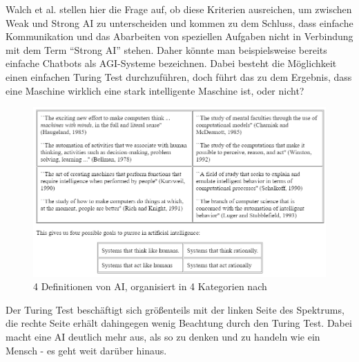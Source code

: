             Walch et al. stellen hier die Frage auf, ob diese Kriterien ausreichen, um zwischen Weak und Strong AI
            zu unterscheiden und kommen zu dem Schluss, dass einfache Kommunikation und das Abarbeiten von
            speziellen Aufgaben nicht in Verbindung mit dem Term ``Strong AI'' stehen. Daher könnte man beispielsweise
            bereits einfache Chatbots als AGI-Systeme bezeichnen. \cite{walch_world_2019} Dabei besteht die
            Möglichkeit einen einfachen Turing Test durchzuführen, doch führt das zu dem Ergebnis, dass eine
            Maschine wirklich eine stark intelligente Maschine ist, oder nicht?
            \begin{figure}[h]
                \begin{center}
                    \includegraphics[width=1.0\textwidth]{figures/ai-definitions.png}
                    \caption[4 Definitionen AI]{4 Definitionen von AI, organisiert in 4 Kategorien nach \cite{russell}}
                    \label{pic:ai-definitions}
                \end{center}
            \end{figure}
            Der Turing Test beschäftigt sich größenteils mit der linken Seite des Spektrums, die rechte Seite erhält
            dahingegen wenig Beachtung durch den Turing Test. Dabei macht eine AI deutlich mehr aus, als so zu denken
            und zu handeln wie ein Mensch - es geht weit darüber hinaus.


